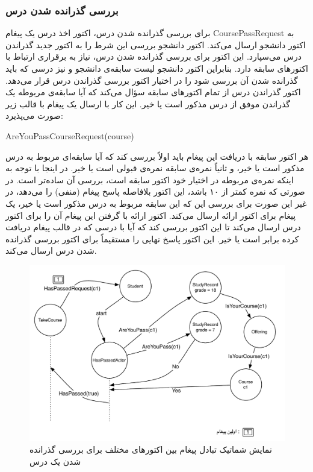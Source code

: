 \subsubsection{بررسی گذرانده شدن درس}
\label{subsection:passCourse}
  برای بررسی گذرانده شدن درس، اکتور اخذ درس یک پیغام CoursePassRequest به اکتور دانشجو ارسال می‌کند. اکتور دانشجو بررسی این شرط را به اکتور جدید گذراندن درس می‌سپارد. این اکتور برای بررسی گذرانده شدن درس، نیاز به برقراری ارتباط با اکتورهای سابقه دارد. بنابراین اکتور دانشجو لیست سابقه‌ی دانشجو و نیز درسی که باید گذرانده شدن آن بررسی شود را در اختیار اکتور بررسی گذراندن درس قرار می‌دهد. اکتور گذراندن درس از تمام اکتورهای سابقه سؤال می‌کند که آیا سابقه‌ی مربوطه یک گذراندن موفق از درس مذکور است یا خیر. این کار با ارسال یک پیغام با قالب زیر صورت می‌پذیرد:
  \begin{latin}
  AreYouPassCourseRequest(course)
  \end{latin}
هر اکتور سابقه‌ با دریافت این پیغام باید اولاً بررسی کند که آیا سابقه‌ای مربوط به درس مذکور است یا خیر، و ثانیاً نمره‌ی سابقه نمره‌ی قبولی است یا خیر. در اینجا با توجه به اینکه نمره‌ی مربوطه در اختیار خود اکتور سابقه است، بررسی آن ساده‌تر است. در صورتی که نمره کمتر از ۱۰ باشد، این اکتور بلافاصله پاسخ پیغام (منفی) را می‌دهد، در غیر این صورت برای بررسی این که این سابقه مربوط به درس مذکور است یا خیر، یک پیغام برای اکتور ارائه ارسال می‌کند. اکتور ارائه با گرفتن این پیغام آن را برای اکتور درس ارسال می‌کند تا این اکتور بررسی کند که آیا با درسی که در قالب پیغام دریافت کرده برابر است یا خیر. این اکتور پاسخ نهایی را مستقیماً برای اکتور بررسی گذرانده شدن درس ارسال می‌کند.  
\begin{figure}
    \begin{center}
	\includegraphics[width=14cm]{4-ProposedFramework/Figures/HasPassed.pdf}
    \end{center}
    \caption{\label{fig:take_course_haspassed}نمایش شماتیک تبادل پیغام بین اکتورهای مختلف برای بررسی گذرانده شدن یک درس }
\end{figure}

